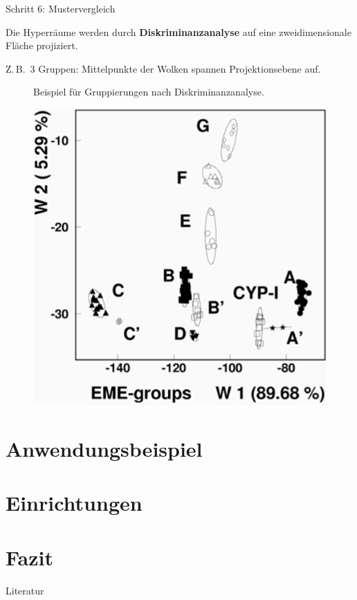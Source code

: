 \documentclass[xcolor=dvipsnames, aspectratio=169]{beamer}
\begin{document}
\begin{frame}{Schritt 6: Mustervergleich}
\begin{minipage}{0.46\textwidth}\flushleft
Die Hyperräume werden durch \textbf{Diskriminanzanalyse} auf eine zweidimensionale Fläche projiziert.\medskip	

Z.\,B.\ 3 Gruppen: Mittelpunkte der Wolken spannen Projektionsebene auf.\bigskip

\begin{figure}
\caption{Beispiel für Gruppierungen nach Diskriminanzanalyse.}
\end{figure}
\end{minipage}\hfill
\begin{minipage}{0.5\textwidth}
\begin{figure}
\includegraphics[width=.8\textwidth]{img/groups.png}
\end{figure}
\end{minipage}
\end{frame}

\section{Anwendungsbeispiel}

\section{Einrichtungen}

\section{Fazit}
\begin{frame}{Literatur}
\nocite{*}

\printbibliography[heading=none]
\end{frame}

\maketitle
\end{document}
